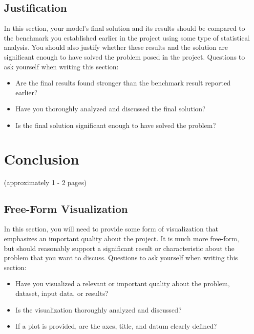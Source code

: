 \section*{Justification}
In this section, your model’s final solution and its results should be compared to the benchmark you established earlier in the project using some type of statistical analysis. You should also justify whether these results and the solution are significant enough to have solved the problem posed in the project. Questions to ask yourself when writing this section:
\begin{itemize}%
\item Are the final results found stronger than the benchmark result reported earlier?
\item Have you thoroughly analyzed and discussed the final solution?
\item Is the final solution significant enough to have solved the problem?
\end{itemize}


\chapter*{Conclusion}
(approximately 1 - 2 pages)

\section*{Free-Form Visualization}
In this section, you will need to provide some form of visualization that emphasizes an important quality about the project. It is much more free-form, but should reasonably support a significant result or characteristic about the problem that you want to discuss. Questions to ask yourself when writing this section:
\begin{itemize}%
\item Have you visualized a relevant or important quality about the problem, dataset, input data, or results?
\item Is the visualization thoroughly analyzed and discussed?
\item If a plot is provided, are the axes, title, and datum clearly defined?
\end{itemize}


